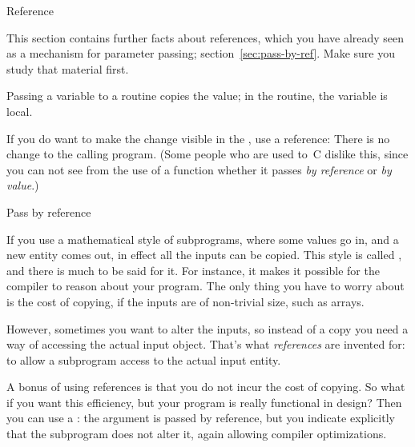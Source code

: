 
 {Reference}
\label{sec:reference}

\begin{nopackt}
  This section contains further facts about references, which you have
  already seen as a mechanism for parameter passing;
  section~\ref{sec:pass-by-ref}.
  Make sure you study that material first.
\end{nopackt}

Passing a variable to a routine copies the value;
in the routine, the variable is local.


If you do want to make the change visible in the
%
, use a reference:
%
%
There is no change to the calling program.
(Some people who are used to~C dislike this,
since you can not see from the use of a function whether it passes
%
\emph{by reference}
%
or \emph{by value}.)

 {Pass by reference}

If you use a mathematical style of subprograms, where some values go
in, and a new entity comes out, in effect all the inputs can be
copied. This style is called
, and
there is much to be said for it. For instance, it makes it possible
for the compiler to reason about your program.
The only thing you have to worry
about is the cost of copying, if the inputs are of non-trivial size,
such as arrays.

However, sometimes you want to alter the inputs, so instead of a copy
you need a way of accessing the actual input object. That's what
\emph{references} are invented for: to allow a subprogram access to the
actual input entity.

A bonus of using references is that you do not incur the cost of
copying. So what if you want this efficiency, but your program is
really functional in design? Then you can use a
: the argument is passed by reference,
but you indicate explicitly that the subprogram does not alter it,
again allowing compiler optimizations.

